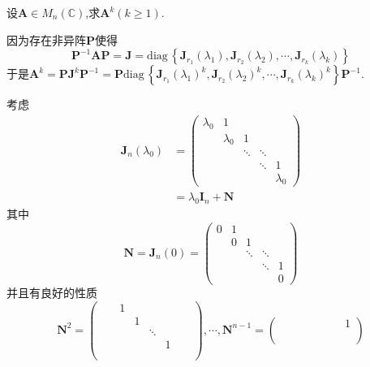 \begin{brown}
    \begin{example}
        设$\bm{A}\in M_n\left(\mathbb{C}\right)$,求$\bm{A}^k\left(k\geqslant 1\right).$
    \end{example}
    \begin{solution}
        因为存在非异阵$\bm{P}$使得\[
        \bm{P}^{-1}\bm{A}\bm{P}=\bm{J}=
        \mathrm{diag}\,\left\{
            \bm{J}_{r_1}\left(\lambda_1\right),\bm{J}_{r_2}\left(\lambda_2\right),\cdots,\bm{J}_{r_k}\left(\lambda_k\right)
        \right\}
        \]于是$\bm{A}^k=\bm{P}\bm{J}^k\bm{P}^{-1}=\bm{P}\mathrm{diag}\,\left\{
            \bm{J}_{r_1}\left(\lambda_1\right)^k,\bm{J}_{r_2}\left(\lambda_2\right)^k,\cdots,\bm{J}_{r_k}\left(\lambda_k\right)^k
        \right\}\bm{P}^{-1}$.

        考虑\begin{align*}\bm{J}_n\left(\lambda_0\right)&=
        \begin{pmatrix}
            \lambda_0&1&&&\\
            &\lambda_0&1&\\
            &&\ddots&\ddots&\\
            &&&\ddots&1\\
            &&&&\lambda_0
        \end{pmatrix}\\
        &=\lambda_0\bm{I}_n+\bm{N}
    \end{align*}其中\[
    \bm{N}=\bm{J}_n\left(0\right)=\begin{pmatrix}
        0&1&&&\\
        &0&1&\\
        &&\ddots&\ddots&\\
        &&&\ddots&1\\
        &&&&0
    \end{pmatrix}
    \]并且有良好的性质\[
    \bm{N}^2=\begin{pmatrix}
        &&1\\
        &&&1\\
        &&&&\ddots\\
        &&&&&1\\
        &&&&&&\\
        &&&&&&&
    \end{pmatrix},\cdots,\bm{N}^{n-1}=\begin{pmatrix}
        &&&&&&&1\\
        \\
        \\

\end{pmatrix}\]
\end{solution}
\end{brown}
